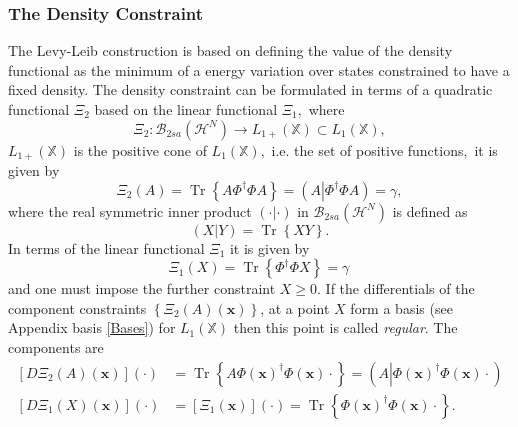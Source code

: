 \documentclass[aps,preprint]{revtex4}%
\begin{document}
\subsubsection{The Density Constraint}

The Levy-Leib construction is based on defining the value of the density
functional as the minimum of a energy variation over states constrained to
have a fixed density. The density constraint can be formulated in terms of a
quadratic functional $\Xi_{2}$ based on the linear functional $\Xi_{1},$
where
\begin{equation}
\Xi_{2}:\mathcal{B}_{2sa}\left(  \mathcal{H}^{N}\right)  \rightarrow
L_{1+}\left(  \mathbb{X}\right)  \subset L_{1}\left(  \mathbb{X}\right)  ,
\end{equation}
$L_{1+}\left(  \mathbb{X}\right)  $ is the positive cone of $L_{1}\left(
\mathbb{X}\right)  ,$ i.e. the set of positive functions$,$ it is given by
\begin{equation}
\Xi_{2}\left(  A\right)  =\operatorname{Tr}\left\{  A\Phi^{\dagger}\Phi
A\right\}  =\left(  A\left\vert \Phi^{\dagger}\Phi A\right.  \right)  =\gamma,
\end{equation}
where the real symmetric inner product $\left(  \cdot\left\vert \cdot\right.
\right)  $ in $\mathcal{B}_{2sa}\left(  \mathcal{H}^{N}\right)  $ is defined
as
\begin{equation}
\left(  X\left\vert Y\right.  \right)  =\operatorname{Tr}\left\{  XY\right\}
.
\end{equation}
In terms of the linear functional $\Xi_{1}$ it is given by
\begin{equation}
\Xi_{1}\left(  X\right)  =\operatorname{Tr}\left\{  \Phi^{\dagger}\Phi
X\right\}  =\gamma\,
\end{equation}
and one must impose the further constraint $X\geq0.$ If the differentials of
the component constraints $\left\{  \Xi_{2}\left(  A\right)  \left(
\mathbf{x}\right)  \right\}  $, at a point $X$ form a basis (see Appendix
basis \ref{Bases}) for $L_{1}\left(  \mathbb{X}\right)  $ then this point is
called \emph{regular}. The components are
\begin{align}
\left[  D\Xi_{2}\left(  A\right)  \left(  \mathbf{x}\right)  \right]  \left(
\cdot\right)   &  =\operatorname{Tr}\left\{  A\Phi\left(  \mathbf{x}\right)
^{\dagger}\Phi\left(  \mathbf{x}\right)  \cdot\right\}  =\left(  A\left\vert
\Phi\left(  \mathbf{x}\right)  ^{\dagger}\Phi\left(  \mathbf{x}\right)
\right.  \cdot\right)  \\
\left[  D\Xi_{1}\left(  X\right)  \left(  \mathbf{x}\right)  \right]  \left(
\cdot\right)   &  =\left[  \Xi_{1}\left(  \mathbf{x}\right)  \right]  \left(
\cdot\right)  =\operatorname{Tr}\left\{  \Phi\left(  \mathbf{x}\right)
^{\dagger}\Phi\left(  \mathbf{x}\right)  \cdot\right\}  .
\end{align}
\end{document}
